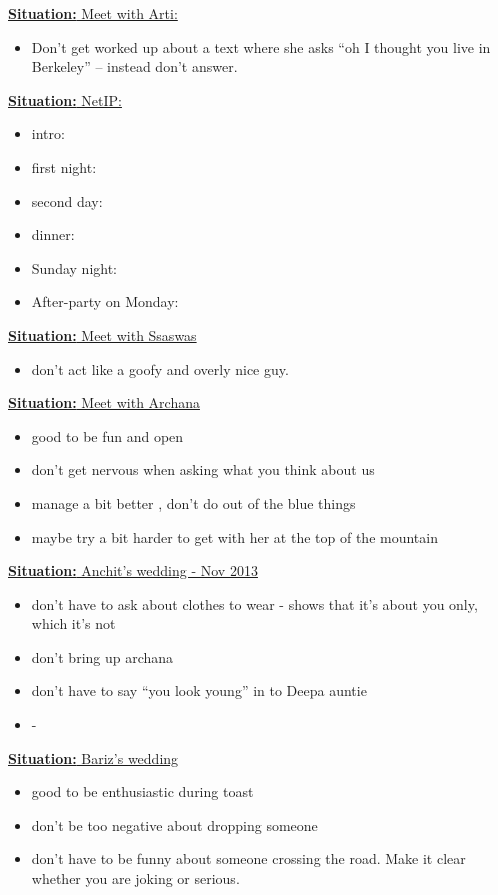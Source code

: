 \documentclass[11pt]{article}
\newcommand{\newSituation}[1]{\underline{\textbf{Situation:} #1} }
\begin{document}
\newSituation{Meet with Arti:} 
\begin{itemize} 
\item Don’t get worked up about a text where she asks “oh I thought you live in Berkeley”  -- instead don’t answer. 
\end{itemize} 

\newSituation{NetIP:} 
\begin{itemize} 
\item intro: 
\item first night: 
\item second day: 
\item dinner: 
\item Sunday night: 
\item After-party on Monday: 
\end{itemize} 


\newSituation{Meet with Ssaswas} 
\begin{itemize} 
\item don’t act like a goofy and overly nice guy. 
\end{itemize} 

\newSituation{Meet with Archana}
\begin{itemize} 
\item good to be fun and open 
\item don't get nervous when asking what you think about us 
\item manage a bit better , don't do out of the blue things 
\item maybe try a bit harder to get with her at the top of the mountain 
\end{itemize} 

\newSituation{Anchit's  wedding - Nov 2013}
\begin{itemize}
\item don't have to ask about clothes to wear - shows that it's about you only, which it's not 
\item don't bring up archana 
\item don't have to say ``you look young''  in to Deepa auntie 
\item -
\end{itemize}

\newSituation{Bariz's wedding} 
\begin{itemize} 
\item good to be enthusiastic during toast 
\item don't be too negative about dropping someone 
\item don't have to be funny about someone crossing the road. Make it clear whether you are joking or serious. 
\end{itemize} 
\end{document}
